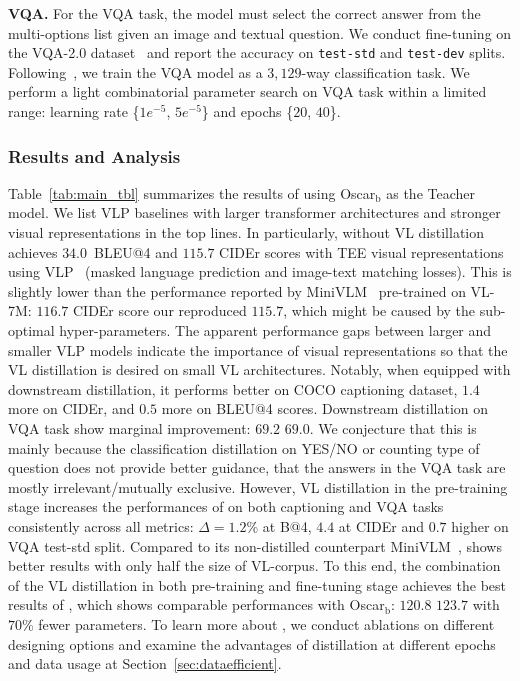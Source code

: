 \noindent \textbf{VQA.} For the VQA task, the model must select the correct answer from the multi-options list given an image and textual question. We conduct fine-tuning on the VQA-2.0 dataset~\cite{balanced_vqa_v2} and report the accuracy on \texttt{test-std} and \texttt{test-dev} splits. Following~\cite{anderson2018bottom}, we train the VQA model as a $3,129$-way classification task. We perform a light combinatorial parameter search on VQA task within a limited range:  learning rate \{$1e^{-5}$, $5e^{-5}$\} and epochs \{$20$, $40$\}. 


\subsubsection{Results and Analysis}
Table~\ref{tab:main_tbl} summarizes the results of \distillvlm using Oscar$_\text{b}$ as the Teacher model. We list VLP baselines with larger transformer architectures and stronger visual representations in the top lines. In particularly, \distillvlm without VL distillation achieves $34.0$\ BLEU@4 and $115.7$ CIDEr scores with TEE visual representations using VLP~\cite{li2020oscar} (masked language prediction and image-text matching losses).  This is slightly lower than the performance reported by MiniVLM~\cite{wang2020minivlm} pre-trained on VL-7M:  $116.7$ CIDEr score \vs our reproduced $115.7$, which might be caused by the sub-optimal hyper-parameters. 
The apparent performance gaps between larger and smaller VLP models indicate the importance of visual representations so that the VL distillation is desired on small VL architectures. Notably, when equipped with downstream distillation, it performs better on COCO captioning dataset, $1.4$ more on CIDEr, and $0.5$ more on BLEU@4 scores. Downstream distillation on VQA task show marginal improvement: $69.2$ \vs $69.0$. 
We conjecture that this is mainly because the classification distillation on YES/NO or counting type of question does not provide better guidance, that the answers in the VQA task are mostly irrelevant/mutually exclusive.
However, VL distillation in the pre-training stage increases the performances of \distillvlm on both captioning and VQA tasks consistently across all metrics: $\Delta=1.2\%$ at B@4, $4.4$ at CIDEr and $0.7$ higher on VQA test-std split. Compared to its non-distilled counterpart MiniVLM~\cite{wang2020minivlm}, \distillvlm shows better results with only half the size of VL-corpus. To this end, the combination of the VL distillation in both pre-training and fine-tuning stage achieves the best results of \distillvlm, which shows comparable performances with Oscar$_\text{b}$: $120.8$ \vs $123.7$ with $70$\% fewer parameters. To learn more about \distillvlm, we conduct ablations on different designing options and examine the advantages of distillation at different epochs and data usage at Section~\ref{sec:dataefficient}.\\ [-1.8ex]


